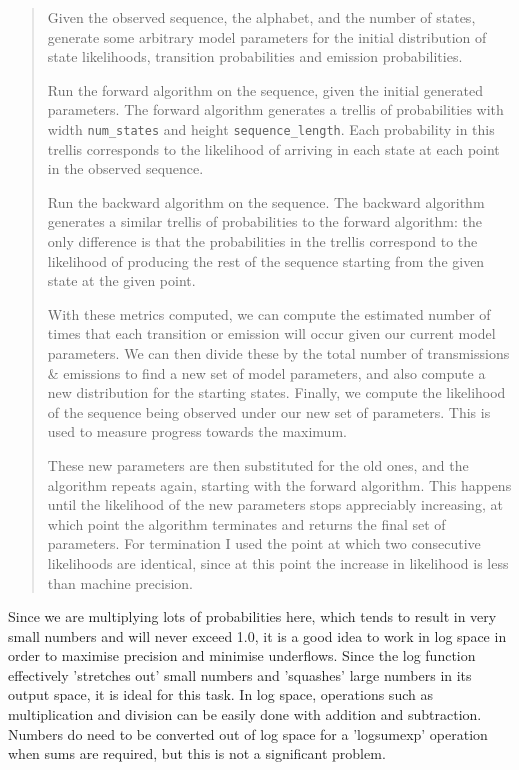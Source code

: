 \documentclass[11pt]{article} %
\begin{document}
\begin{quote}
	Given the observed sequence, the alphabet, and the number of states, generate some arbitrary model parameters for the initial distribution of state likelihoods, transition probabilities and emission probabilities.
	
	Run the forward algorithm on the sequence, given the initial generated parameters. The forward algorithm generates a trellis of probabilities with width \texttt{num\_states} and height \texttt{sequence\_length}. Each probability in this trellis corresponds to the likelihood of arriving in each state at each point in the observed sequence.
	
	Run the backward algorithm on the sequence. The backward algorithm generates a similar trellis of probabilities to the forward algorithm: the only difference is that the probabilities in the trellis correspond to the likelihood of producing the rest of the sequence starting from the given state at the given point.
	
	With these metrics computed, we can compute the estimated number of times that each transition or emission will occur given our current model parameters. We can then divide these by the total number of transmissions \& emissions to find a new set of model parameters, and also compute a new distribution for the starting states. Finally, we compute the likelihood of the sequence being observed under our new set of parameters. This is used to measure progress towards the maximum.
	
	These new parameters are then substituted for the old ones, and the algorithm repeats again, starting with the forward algorithm. This happens until the likelihood of the new parameters stops appreciably increasing, at which point the algorithm terminates and returns the final set of parameters. For termination I used the point at which two consecutive likelihoods are identical, since at this point the increase in likelihood is less than machine precision.
\end{quote}

Since we are multiplying lots of probabilities here, which tends to result in very small numbers and will never exceed 1.0, it is a good idea to work in log space in order to maximise precision and minimise underflows. Since the log function effectively 'stretches out' small numbers and 'squashes' large numbers in its output space, it is ideal for this task. In log space, operations such as multiplication and division can be easily done with addition and subtraction. Numbers do need to be converted out of log space for a 'logsumexp' operation when sums are required, but this is not a significant problem.
\end{document}
